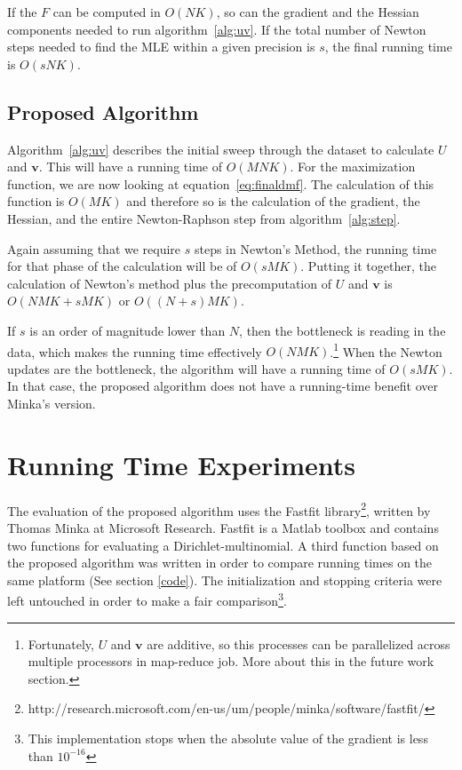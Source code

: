 \documentclass[twoside]{article}
\begin{document}
If the $F$ can be computed in $O(NK)$, so can the gradient and the Hessian components needed to run algorithm~\ref{alg:uv}. If the total number of Newton steps needed to find the MLE within a given precision is $s$, the final running time is $O(sNK)$.
\subsection{Proposed Algorithm}

Algorithm~\ref{alg:uv} describes the initial sweep through the dataset to calculate $U$ and $\mathbf{v}$.  This will have a running time of $O(MNK)$.
For the maximization function, we are now looking at equation~\eqref{eq:finaldmf}.  The calculation of this function is $O(MK)$ and therefore so is the calculation of the gradient, the Hessian, and the entire Newton-Raphson step from algorithm~\ref{alg:step}.

Again assuming that we require $s$ steps in Newton's Method, the running time for that phase of the calculation will be of $O(sMK)$.
Putting it together, the calculation of Newton's method plus the precomputation of $U$ and $\mathbf{v}$ is $O(NMK + sMK)$ or $O((N+s)MK)$.

If $s$ is an order of magnitude lower than $N$, then the bottleneck is reading in the data, which makes the running time effectively $O(NMK)$.\footnote{Fortunately, $U$ and $\mathbf{v}$ are additive, so this processes can be parallelized across multiple processors in map-reduce job. More about this in the future work section.} When the Newton updates are the bottleneck, the algorithm will have a running time of $O(sMK)$.  In that case, the proposed algorithm does not have a running-time benefit over Minka's version.

\section{Running Time Experiments} \label{section:experiments}
The evaluation of the proposed algorithm uses the Fastfit library\footnote{http://research.microsoft.com/en-us/um/people/minka/software/fastfit/}, written by Thomas Minka at Microsoft Research\cite{minka}.  Fastfit is a Matlab toolbox and contains two functions for evaluating a Dirichlet-multinomial. A third function based on the proposed algorithm was written in order to compare running times on the same platform (See section \ref{code}).  The initialization and stopping criteria were left untouched in order to make a fair comparison\footnote{This implementation stops when the absolute value of the gradient is less than $10^{-16}$}.
\end{document}
